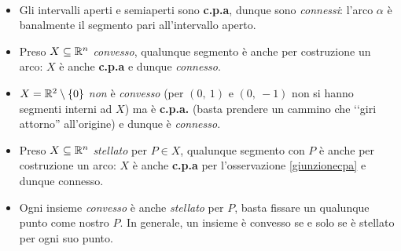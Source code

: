 \begin{examples}~{}
	\begin{itemize}
		\item Gli intervalli aperti e semiaperti sono \textbf{c.p.a}, dunque sono \textit{connessi}: l'arco $\alpha$ è banalmente il segmento pari all'intervallo aperto.
		\item Preso $X\subseteq\mathbb{R}^n$ \textit{convesso}, qualunque segmento è anche per costruzione un arco: $X$ è anche \textbf{c.p.a} e dunque \textit{connesso}.
		\item $X=\mathbb{R}^{2}\setminus\left\{0\right\}$ \textit{non} è \textit{convesso} (per $\left(0,\ 1\right)$ e $\left(0,\ -1\right)$ non si hanno segmenti interni ad $X$) ma è \textbf{c.p.a.} (basta prendere un cammino che ‘‘giri attorno'' all'origine) e dunque è \textit{connesso}.
		\item Preso $X\subseteq\mathbb{R}^n$ \textit{stellato} per $P\in X$, qualunque segmento con $P$ è anche per costruzione un arco: $X$ è anche \textbf{c.p.a} per l'osservazione \ref{giunzionecpa} e dunque {connesso}.
		\item Ogni insieme \textit{convesso} è anche \textit{stellato} per $P$, basta fissare un qualunque punto come nostro $P$. In generale, un insieme è convesso se e solo se è stellato per ogni suo punto.
	\end{itemize}
\end{examples}